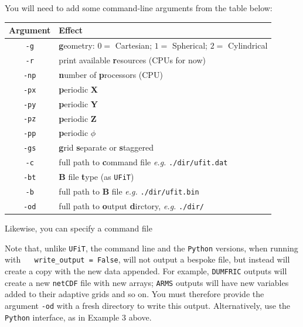 \documentclass[12pt,twoside]{article}
\begin{document}
You will need to add some command-line arguments from the table below:

\vspace{2mm}

\begin{tabular}{|c|l|}		
		\hline
		\textbf{Argument} & \textbf{Effect} \\\hline\hline
		\texttt{-g} & \textbf{g}eometry: $0 =$ Cartesian; $1 =$ Spherical; $2 =$ Cylindrical  \\\hline
		\texttt{-r} & print available \textbf{r}esources (CPUs for now) \\\hline
		\texttt{-np} &  \textbf{n}umber of \textbf{p}rocessors (CPU) \\\hline
		\texttt{-px} & \textbf{p}eriodic \textbf{X} \\\hline
		\texttt{-py} & \textbf{p}eriodic \textbf{Y}  \\\hline
		\texttt{-pz} & \textbf{p}eriodic \textbf{Z}  \\\hline
		\texttt{-pp} & \textbf{p}eriodic $\phi$  \\\hline
		\texttt{-gs} & \textbf{g}rid \textbf{s}eparate or \textbf{s}taggered  \\\hline
		\texttt{-c} & full path to \textbf{c}ommand file \textit{e.g.} \texttt{./dir/ufit.dat} \\\hline
		\texttt{-bt} & $\mathbf{B}$ file \textbf{t}ype (as \texttt{UFiT}) \\\hline
		\texttt{-b} & full path to $\mathbf{B}$ file \textit{e.g.} \texttt{./dir/ufit.bin} \\\hline
		\texttt{-od} & full path to \textbf{o}utput \textbf{d}irctory, \textit{e.g.} \texttt{./dir/} \\\hline
\end{tabular}

\vspace{2mm}

Likewise, you can specify a command file

Note that, unlike \texttt{UFiT}, the command line and the \texttt{Python} versions, when running with $\quad$ \texttt{write\_output = False}, will not output a bespoke file, but instead will create a copy with the new data appended. For example, \texttt{DUMFRIC} outputs will create a new \texttt{netCDF} file with new arrays; \texttt{ARMS} outputs will have new variables added to their adaptive grids and so on. You must therefore provide the argument \texttt{-od} with a fresh directory to write this output. Alternatively, use the \texttt{Python} interface, as in Example 3 above.
\end{document}

